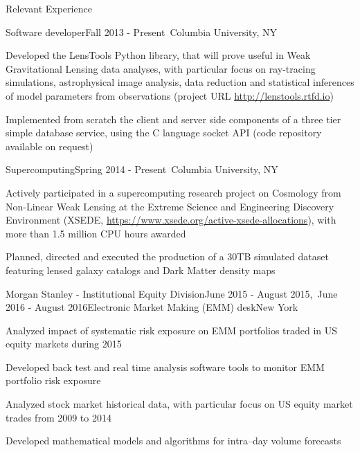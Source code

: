 \documentclass{resume} %
\begin{document}
\begin{rSection}{Relevant Experience}

\begin{rSubsection}{Software developer}{Fall 2013 - Present}{\textcolor{white}{a}}{Columbia University, NY}
\item Developed the LensTools Python library, that will prove useful in Weak Gravitational Lensing data analyses, with particular focus on ray-tracing simulations, astrophysical image analysis, data reduction and statistical inferences of model parameters from observations (project URL \url{http://lenstools.rtfd.io})
\item Implemented from scratch the client and server side components of a three tier simple database service, using the C language socket API (code repository available on request)
\end{rSubsection}

\begin{rSubsection}{Supercomputing}{Spring 2014 - Present}{\textcolor{white}{a}}{Columbia University, NY}
\item Actively participated in a supercomputing research project on Cosmology from Non-Linear Weak Lensing at the Extreme Science and Engineering Discovery Environment (XSEDE, \url{https://www.xsede.org/active-xsede-allocations}), with more than 1.5 million CPU hours awarded
\item Planned, directed and executed the production of a 30TB simulated dataset featuring lensed galaxy catalogs and Dark Matter density maps 
\end{rSubsection}

\begin{rSubsection}{Morgan Stanley - Institutional Equity Division}{June 2015 - August 2015,\,\,\,June 2016 - August 2016}{Electronic Market Making (EMM) desk}{New York}
\item Analyzed impact of systematic risk exposure on EMM portfolios traded in US equity markets during 2015
\item Developed back test and real time analysis software tools to monitor EMM portfolio risk exposure 
\item Analyzed stock market historical data, with particular focus on US equity market trades from 2009 to 2014
\item Developed mathematical models and algorithms for intra--day volume forecasts 
\end{rSubsection}

\end{rSection}
\end{document}
